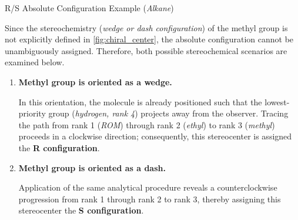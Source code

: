 \documentclass[10pt]{article}
\begin{document}
      \begin{core}[label=core:abs_example]{R/S Absolute Configuration Example (\textit{Alkane})}

        Since the stereochemistry (\textit{wedge or dash configuration}) of the methyl group is not explicitly defined in \autoref{fig:chiral_center}, the absolute configuration cannot be unambiguously assigned. Therefore, both possible stereochemical scenarios are examined below.

        \begin{enumerate}
          
          \item \textbf{Methyl group is oriented as a wedge.}


          In this orientation, the molecule is already positioned such that the lowest-priority group (\textit{hydrogen, rank 4}) projects away from the observer. Tracing the path from rank 1 (\textit{ROM}) through rank 2 (\textit{ethyl}) to rank 3 (\textit{methyl}) proceeds in a clockwise direction; consequently, this stereocenter is assigned the \textbf{R configuration}.


          \item \textbf{Methyl group is oriented as a dash.}


          Application of the same analytical procedure reveals a counterclockwise progression from rank 1 through rank 2 to rank 3, thereby assigning this stereocenter the \textbf{S configuration}.


\end{enumerate}
\end{core}
\end{document}
